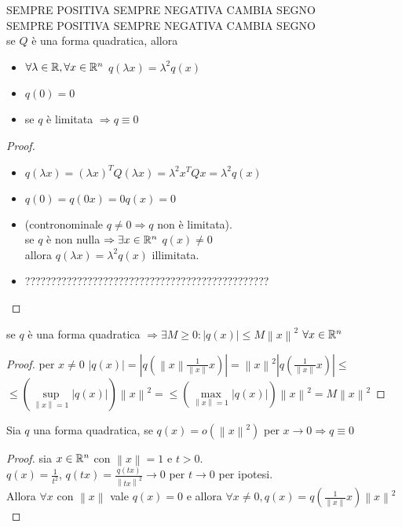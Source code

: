 SEMPRE POSITIVA SEMPRE NEGATIVA CAMBIA SEGNO\\
SEMPRE POSITIVA SEMPRE NEGATIVA CAMBIA SEGNO\\
\proposition
se $Q$ è una forma quadratica, allora\\
\begin{itemize}
	\item $\forall\lambda\in \mathbb{R}, \forall x\in \mathbb{R}^n$ $q(\lambda x)=\lambda^2q(x)$
	\item $q(0)=0$
	\item se $q$ è limitata $\Rightarrow q\equiv 0$ 
\end{itemize}
\begin{proof}
	\begin{itemize}
		\item $q(\lambda x)=(\lambda x)^TQ(\lambda x)=\lambda^2x^TQx=\lambda^2q(x)$
		\item $q(0)=q(0x)=0q(x)=0$
		\item (contronominale $q\ne 0 \Rightarrow q$ non è limitata).\\
		se $q$ è non nulla $\Rightarrow \exists x \in \mathbb{R}^n$ $q(x)\ne 0$\\
		allora $q(\lambda x)=\lambda^2q(x)$ illimitata.
		\item ???????????????????????????????????????????????
	\end{itemize}
\end{proof}
\proposition
se $q$ è una forma quadratica $\Rightarrow\exists M\ge 0: |q(x)|\le M\left\| x \right\|^2$ $\forall x\in \mathbb{R}^n$
\begin{proof}
	per $x\ne 0$ $\left| q(x)\right| =\left| q\left(\left\| x\right\| \frac{1}{\left\| x\right\| }x\right) \right| = \left\|x\right\|^2\left|q\left(\frac{1}{\left\|x\right\|}x\right)\right|\le$\\
	$\le\left(\sup\limits_{\left\|x\right\|=1}\left|q(x)\right|\right)\left\|x\right\|^2=\le\left(\max\limits_{\left\|x\right\|=1}\left|q(x)\right|\right)\left\|x\right\|^2=M\left\|x\right\|^2$
\end{proof}
\proposition
Sia $q$ una forma quadratica, se $q(x)=o(\left\|x\right\|^2)$ per $x\rightarrow 0 \Rightarrow q\equiv 0$
\begin{proof}
	sia $x\in \mathbb{R}^n$ con $\left\|x\right\|=1$ e $t>0$.\\
	$q(x)=\frac{1}{t^2}$, $q(tx)=\frac{q(tx)}{\left\|tx\right\|^2}\rightarrow 0$ per $t\rightarrow 0$ per ipotesi.\\
	Allora $\forall x$ con $\left\|x\right\|$ vale $q(x)=0$ e allora $\forall x\ne 0, q(x)=q\left(\frac{1}{\left\|x\right\|}x\right)\left\|x\right\|^2$
\end{proof}
